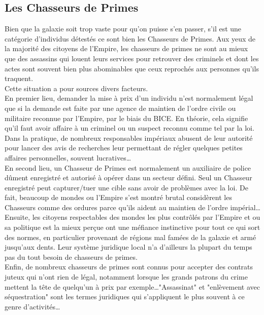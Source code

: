\documentclass[twoside]{article}
\begin{document}
\subsection{Les Chasseurs de Primes}
Bien que la galaxie soit trop vaste pour qu'on puisse s'en passer, s'il est une catégorie d'individus détestés ce sont bien les Chasseurs de Primes. Aux yeux de la majorité des citoyens de l'Empire, les chasseurs de primes ne sont au mieux que des assassins qui louent leurs services pour retrouver des criminels et dont les actes sont souvent bien plus abominables que ceux reprochés aux personnes qu'ils traquent.\\

Cette situation a pour sources divers facteurs.\\

En premier lieu, demander la mise à prix d'un individu n'est normalement légal que si la demande est faite par une agence de maintien de l'ordre civile ou militaire reconnue par l'Empire, par le biais du BICE. En théorie, cela signifie qu'il faut avoir affaire à un criminel ou un suspect reconnu comme tel par la loi. Dans la pratique, de nombreux responsables impériaux abusent de leur autorité pour lancer des avis de recherches leur permettant de régler quelques petites affaires personnelles, souvent lucratives\ldots\\

En second lieu, un Chasseur de Primes est normalement un auxiliaire de police dûment enregistré et autorisé à opérer dans un secteur défini. Seul un Chasseur enregistré peut capturer/tuer une cible sans avoir de problèmes avec la loi. De fait, beaucoup de mondes ou l'Empire s'est montré brutal considèrent les Chasseurs comme des ordures parce qu'ils aident au maintien de l'ordre impérial\ldots
Ensuite, les citoyens respectables des mondes les plus contrôlés par l'Empire et ou sa politique est la mieux perçue ont une méfiance instinctive pour tout ce qui sort des normes, en particulier provenant de régions mal famées de la galaxie et armé jusqu'aux dents. Leur système juridique local n'a d'ailleurs la plupart du temps pas du tout besoin de chasseurs de primes.\\

Enfin, de nombreux chasseurs de primes sont connus pour accepter des contrats juteux qui n'ont rien de légal, notamment lorsque les grands patrons du crime mettent la tête de quelqu'un à prix par exemple\ldots "Assassinat" et "enlèvement avec séquestration" sont les termes juridiques qui s'appliquent le plus souvent à ce genre d'activités\ldots
\end{document}
